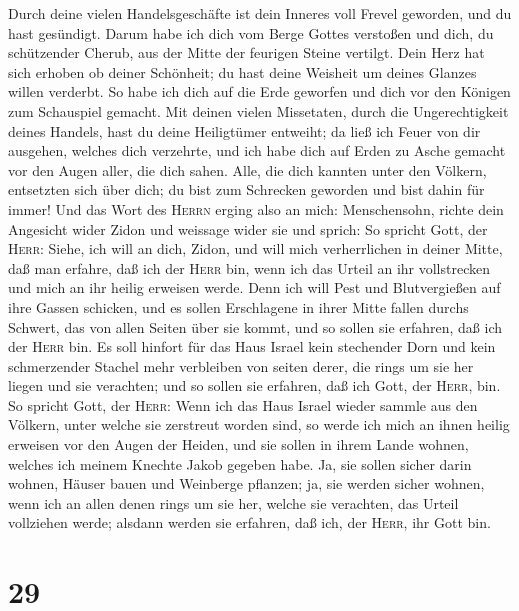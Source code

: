  Durch deine vielen Handelsgeschäfte ist dein Inneres
voll Frevel geworden, und du hast gesündigt. Darum habe ich dich vom
Berge Gottes verstoßen und dich, du schützender Cherub, aus der Mitte
der feurigen Steine vertilgt.  Dein Herz hat sich erhoben
ob deiner Schönheit; du hast deine Weisheit um deines Glanzes willen
verderbt. So habe ich dich auf die Erde geworfen und dich vor den
Königen zum Schauspiel gemacht.  Mit deinen vielen
Missetaten, durch die Ungerechtigkeit deines Handels, hast du deine
Heiligtümer entweiht; da ließ ich Feuer von dir ausgehen, welches dich
verzehrte, und ich habe dich auf Erden zu Asche gemacht vor den Augen
aller, die dich sahen.  Alle, die dich kannten unter den
Völkern, entsetzten sich über dich; du bist zum Schrecken geworden und
bist dahin für immer!  Und das Wort des \textsc{Herrn}
erging also an mich:  Menschensohn, richte dein Angesicht
wider Zidon und weissage wider sie  und sprich: So
spricht Gott, der \textsc{Herr}: Siehe, ich will an dich, Zidon, und
will mich verherrlichen in deiner Mitte, daß man erfahre, daß ich der
\textsc{Herr} bin, wenn ich das Urteil an ihr vollstrecken und mich an
ihr heilig erweisen werde.  Denn ich will Pest und
Blutvergießen auf ihre Gassen schicken, und es sollen Erschlagene in
ihrer Mitte fallen durchs Schwert, das von allen Seiten über sie kommt,
und so sollen sie erfahren, daß ich der \textsc{Herr} bin.
 Es soll hinfort für das Haus Israel kein stechender Dorn
und kein schmerzender Stachel mehr verbleiben von seiten derer, die
rings um sie her liegen und sie verachten; und so sollen sie erfahren,
daß ich Gott, der \textsc{Herr}, bin.  So spricht Gott,
der \textsc{Herr}: Wenn ich das Haus Israel wieder sammle aus den
Völkern, unter welche sie zerstreut worden sind, so werde ich mich an
ihnen heilig erweisen vor den Augen der Heiden, und sie sollen in ihrem
Lande wohnen, welches ich meinem Knechte Jakob gegeben habe.
 Ja, sie sollen sicher darin wohnen, Häuser bauen und
Weinberge pflanzen; ja, sie werden sicher wohnen, wenn ich an allen
denen rings um sie her, welche sie verachten, das Urteil vollziehen
werde; alsdann werden sie erfahren, daß ich, der \textsc{Herr}, ihr Gott
bin.

\hypertarget{section-28}{%
\section{29}\label{section-28}}

